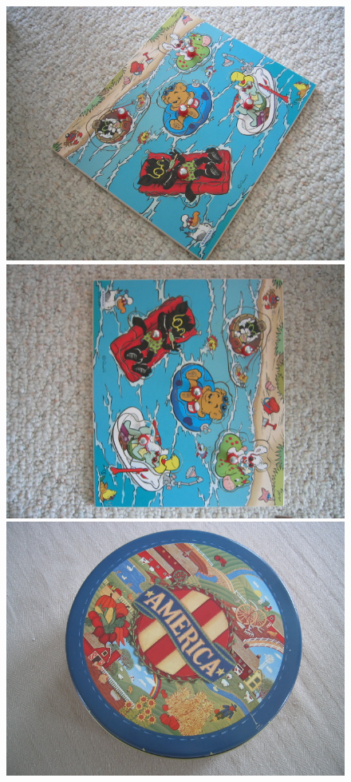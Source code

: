 \documentclass[10pt,conference,a4paper]{IEEEtran}
\begin{document}
		\begin{figure}
			\centering
			\resizebox{1.975\columnwidth}{!}
			{
				\includegraphics[scale=0.091]{ukbench00000.jpg}
				\includegraphics[scale=0.091]{ukbench00002.jpg}
				\includegraphics[scale=0.091]{ukbench00005.jpg}
}
\end{figure}
\end{document}
